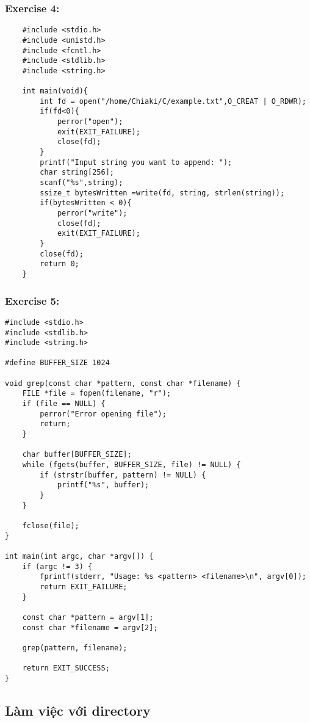 \documentclass{article}
\begin{document}
\subsubsection{Exercise 4:}
\begin{verbatim}
    #include <stdio.h>
    #include <unistd.h>
    #include <fcntl.h>
    #include <stdlib.h>
    #include <string.h>
    
    int main(void){
        int fd = open("/home/Chiaki/C/example.txt",O_CREAT | O_RDWR);
        if(fd<0){
            perror("open");
            exit(EXIT_FAILURE);
            close(fd);
        }
        printf("Input string you want to append: ");
        char string[256];
        scanf("%s",string);
        ssize_t bytesWritten =write(fd, string, strlen(string));
        if(bytesWritten < 0){
            perror("write");
            close(fd);
            exit(EXIT_FAILURE);
        }
        close(fd);
        return 0;
    }
\end{verbatim}
\subsubsection{Exercise 5: }
\begin{verbatim}
#include <stdio.h> 
#include <stdlib.h> 
#include <string.h> 
 
#define BUFFER_SIZE 1024 
 
void grep(const char *pattern, const char *filename) { 
    FILE *file = fopen(filename, "r"); 
    if (file == NULL) { 
        perror("Error opening file"); 
        return; 
    } 
 
    char buffer[BUFFER_SIZE]; 
    while (fgets(buffer, BUFFER_SIZE, file) != NULL) { 
        if (strstr(buffer, pattern) != NULL) { 
            printf("%s", buffer); 
        } 
    } 
 
    fclose(file); 
} 
 
int main(int argc, char *argv[]) { 
    if (argc != 3) { 
        fprintf(stderr, "Usage: %s <pattern> <filename>\n", argv[0]); 
        return EXIT_FAILURE; 
    } 
 
    const char *pattern = argv[1]; 
    const char *filename = argv[2]; 
 
    grep(pattern, filename); 
 
    return EXIT_SUCCESS; 
}
\end{verbatim}
\subsection{Làm việc với directory}
\end{document}
